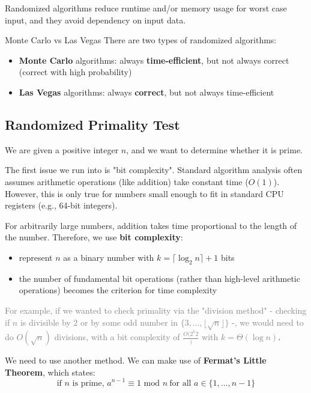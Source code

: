 \documentclass[a4paper, 11pt]{report}
\begin{document}
Randomized algorithms reduce runtime and/or memory usage for worst case input, and they avoid dependency on input data.

\begin{defframe}{Monte Carlo vs Las Vegas}{}
    There are two types of randomized algorithms:
    \begin{itemize}
        \item \textbf{Monte Carlo} algorithms: always \textbf{time-efficient}, but not always correct (correct with high probability)
        \item \textbf{Las Vegas} algorithms: always \textbf{correct}, but not always time-efficient
    \end{itemize}
\end{defframe}

\subsection{Randomized Primality Test}
We are given a positive integer $n$, and we want to determine whether it is prime.

The first issue we run into is "bit complexity". Standard algorithm analysis often assumes arithmetic operations (like addition) take constant time ($O(1)$). However, this is only true for numbers small enough to fit in standard CPU registers (e.g., 64-bit integers). 

    For arbitrarily large numbers, addition takes time proportional to the length of the number. Therefore, we use \textbf{bit complexity}:
    \begin{itemize}
        \item represent $n$ as a binary number with $k = \lceil \log_2 n \rceil + 1$ bits
        \item the number of fundamental bit operations (rather than high-level arithmetic operations) becomes the criterion for time complexity
    \end{itemize}

    \textcolor{gray}{For example, if we wanted to check primality via the "division method" - checking if $n$ is divisible by $2$ or by some odd number in $\{3, \dots, \lfloor\sqrt{n}\rfloor \}$ -, we would need to do $O(\sqrt{n})$ divisions, with a bit complexity of $\frac{O(2^{k}{2}})$ with $k = \Theta(\log n)$}.

We need to use another method. We can make use of \textbf{Fermat's Little Theorem}, which states:
$$\text{if } n \text{ is prime, } a^{n-1}\equiv 1 \text{ mod } n \ \text{for all } a \in \{1, \dots, n-1\}$$
\end{document}
